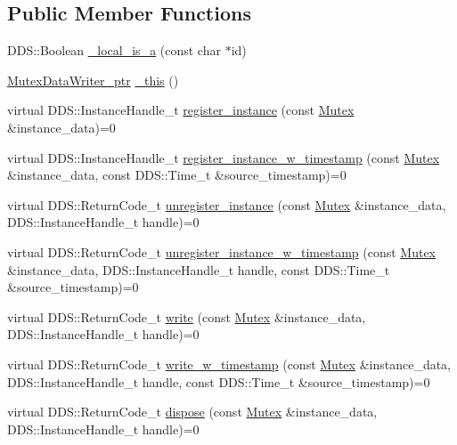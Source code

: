 \subsection*{Public Member Functions}
\begin{DoxyCompactItemize}
\item 
DDS::Boolean \hyperlink{classKnowledge_1_1MutexDataWriter_a79756367d040d9d0963723b9364d2f9d}{\_\-local\_\-is\_\-a} (const char $\ast$id)
\item 
\hyperlink{classKnowledge_1_1MutexDataWriter}{MutexDataWriter\_\-ptr} \hyperlink{classKnowledge_1_1MutexDataWriter_aa1d4787585900fca1a5dd2945ec5e67b}{\_\-this} ()
\item 
virtual DDS::InstanceHandle\_\-t \hyperlink{classKnowledge_1_1MutexDataWriter_a7c68abd7dbd59a61591cf692c8e18ad2}{register\_\-instance} (const \hyperlink{structKnowledge_1_1Mutex}{Mutex} \&instance\_\-data)=0
\item 
virtual DDS::InstanceHandle\_\-t \hyperlink{classKnowledge_1_1MutexDataWriter_a0ff4ed45ede7527c3831960eeec1c59b}{register\_\-instance\_\-w\_\-timestamp} (const \hyperlink{structKnowledge_1_1Mutex}{Mutex} \&instance\_\-data, const DDS::Time\_\-t \&source\_\-timestamp)=0
\item 
virtual DDS::ReturnCode\_\-t \hyperlink{classKnowledge_1_1MutexDataWriter_aadc1341612204f33260daba708c02fee}{unregister\_\-instance} (const \hyperlink{structKnowledge_1_1Mutex}{Mutex} \&instance\_\-data, DDS::InstanceHandle\_\-t handle)=0
\item 
virtual DDS::ReturnCode\_\-t \hyperlink{classKnowledge_1_1MutexDataWriter_ab2838f1a4d051050fb3348d3169a6359}{unregister\_\-instance\_\-w\_\-timestamp} (const \hyperlink{structKnowledge_1_1Mutex}{Mutex} \&instance\_\-data, DDS::InstanceHandle\_\-t handle, const DDS::Time\_\-t \&source\_\-timestamp)=0
\item 
virtual DDS::ReturnCode\_\-t \hyperlink{classKnowledge_1_1MutexDataWriter_a6d2ed8805efb759b25f5981530c4a47a}{write} (const \hyperlink{structKnowledge_1_1Mutex}{Mutex} \&instance\_\-data, DDS::InstanceHandle\_\-t handle)=0
\item 
virtual DDS::ReturnCode\_\-t \hyperlink{classKnowledge_1_1MutexDataWriter_a2b9c4dd693451bd6319fae4fbbc17a70}{write\_\-w\_\-timestamp} (const \hyperlink{structKnowledge_1_1Mutex}{Mutex} \&instance\_\-data, DDS::InstanceHandle\_\-t handle, const DDS::Time\_\-t \&source\_\-timestamp)=0
\item 
virtual DDS::ReturnCode\_\-t \hyperlink{classKnowledge_1_1MutexDataWriter_a4d7b7ee099119775d9b6ff120265d9be}{dispose} (const \hyperlink{structKnowledge_1_1Mutex}{Mutex} \&instance\_\-data, DDS::InstanceHandle\_\-t handle)=0

\end{DoxyCompactItemize}
